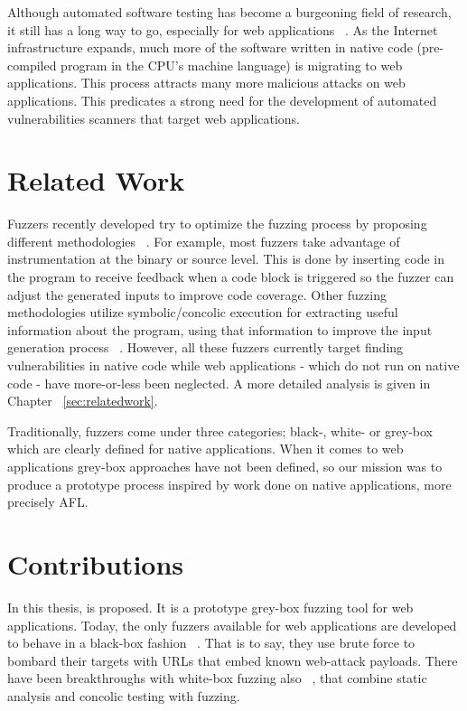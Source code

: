 Although automated software testing has become a burgeoning field of research, it still has a long way to go, especially for web applications ~\cite{doupe2010johnny}. As the Internet infrastructure expands, much more of the software written in native code (pre-compiled program in the CPU's machine language) is migrating to web applications. This process attracts many more malicious attacks on web applications. This predicates a strong need for the development of automated vulnerabilities scanners that target web applications.
 
\section{Related Work}
Fuzzers recently developed try to optimize the fuzzing process by proposing different methodologies ~\cite{godefroid2012sage, stephens2016driller, rawat2017vuzzer, aschermann2019nautilus, aschermann2019redqueen, hoffman2020Was, osterlund2020parmesan}. 
For example, most fuzzers take advantage of instrumentation at the binary or source level. This is done by inserting code in the program to receive feedback when a code block is
triggered so the fuzzer can adjust the generated inputs to improve code coverage. 
Other fuzzing methodologies utilize symbolic/concolic execution for extracting useful information about the program, using that information to improve the input generation process ~\cite{Godefroid2008AutomatedWF,stephens2016driller,godefroid2005dart,godefroid2012sage}. However, all these fuzzers currently target finding vulnerabilities in native code while web applications - which do not run on native code - have more-or-less been neglected. A more detailed analysis is given in Chapter ~\ref{sec:relatedwork}.

Traditionally, fuzzers come under three categories; black-, white- or grey-box which are clearly defined for native applications. When it comes to web applications grey-box approaches have not been defined, so our mission was to produce a prototype process inspired by work done on native applications, more precisely AFL.

\section{Contributions}
In this thesis, \pname{} is proposed. It is a prototype grey-box fuzzing tool for web applications. Today, the only fuzzers available for web applications are developed to behave in a black-box fashion ~\cite{doupe2010johnny}. That is to say, they use brute force to bombard their targets with URLs that embed known web-attack payloads. There have been breakthroughs with white-box fuzzing also ~\cite{navex2018,Borges2018BaZINGAWF}, that combine static analysis and concolic testing with fuzzing.

